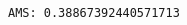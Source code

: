 \par\vspace{1\smallerfontscale}%
    \begin{addmargin}[\cellleftmargin]{0em}%
    {\smaller%
    \vspace{-1\smallerfontscale}%
    
    \begin{Verbatim}[commandchars=\\\{\}]
AMS: 0.38867392440571713
    \end{Verbatim}
}%
    \end{addmargin}%

{\par%
\vspace{-1\baselineskip}%
}%
\begin{notebookcell}[]%
\begin{addmargin}[\cellleftmargin]{0em}%
{\smaller%
\par%
%
\vspace{-1\smallerfontscale}%
\begin{Verbatim}[commandchars=\\\{\}]

\end{Verbatim}
%
\par%
\vspace{-1\smallerfontscale}}%
\end{addmargin}
\end{notebookcell}